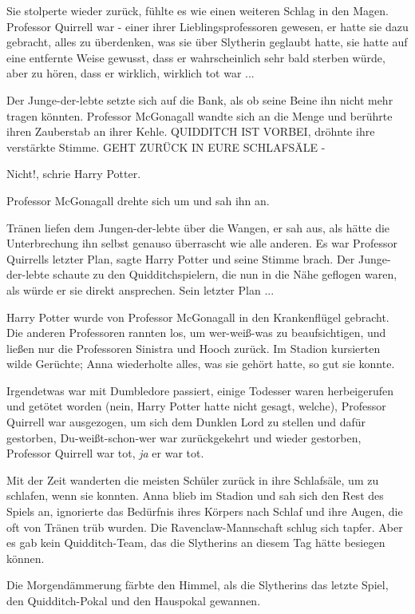 Sie stolperte wieder zurück, fühlte es wie einen weiteren Schlag in den Magen.
Professor Quirrell war - einer ihrer Lieblingsprofessoren gewesen, er hatte sie
dazu gebracht, alles zu überdenken, was sie über Slytherin geglaubt hatte, sie
hatte auf eine entfernte Weise gewusst, dass er wahrscheinlich sehr bald sterben
würde, aber zu hören, dass er wirklich, wirklich tot war ...

Der Junge-der-lebte setzte sich auf die Bank, als ob seine Beine ihn nicht mehr
tragen könnten. Professor McGonagall wandte sich an die Menge und berührte ihren
Zauberstab an ihrer Kehle. \glqq{}QUIDDITCH IST VORBEI\grqq{}, dröhnte ihre
verstärkte Stimme. \glqq{}GEHT ZURÜCK IN EURE SCHLAFSÄLE -\grqq{}

\glqq{}Nicht!\grqq{}, schrie Harry Potter.

Professor McGonagall drehte sich um und sah ihn an.

Tränen liefen dem Jungen-der-lebte über die Wangen, er sah aus, als hätte die
Unterbrechung ihn selbst genauso überrascht wie alle anderen. \glqq{}Es war
Professor Quirrells letzter Plan\grqq{}, sagte Harry Potter und seine Stimme
brach. Der Junge-der-lebte schaute zu den Quidditchspielern, die nun in die Nähe
geflogen waren, als würde er sie direkt ansprechen. \glqq{}Sein letzter Plan ...\grqq{}

Harry Potter wurde von Professor McGonagall in den Krankenflügel gebracht. Die
anderen Professoren rannten los, um wer-weiß-was zu beaufsichtigen, und ließen
nur die Professoren Sinistra und Hooch zurück. Im Stadion kursierten wilde
Gerüchte; Anna wiederholte alles, was sie gehört hatte, so gut sie konnte.

Irgendetwas war mit Dumbledore passiert, einige Todesser waren herbeigerufen und
getötet worden (nein, Harry Potter hatte nicht gesagt, welche), Professor
Quirrell war ausgezogen, um sich dem Dunklen Lord zu stellen und dafür
gestorben, Du-weißt-schon-wer war zurückgekehrt und wieder gestorben, Professor
Quirrell war tot, \emph{ja} er war tot.

Mit der Zeit wanderten die meisten Schüler zurück in ihre Schlafsäle, um zu
schlafen, wenn sie konnten. Anna blieb im Stadion und sah sich den Rest des
Spiels an, ignorierte das Bedürfnis ihres Körpers nach Schlaf und ihre Augen,
die oft von Tränen trüb wurden. Die Ravenclaw-Mannschaft schlug sich tapfer.
Aber es gab kein Quidditch-Team, das die Slytherins an diesem Tag hätte besiegen
können.

Die Morgendämmerung färbte den Himmel, als die Slytherins das letzte Spiel, den
Quidditch-Pokal und den Hauspokal gewannen.

